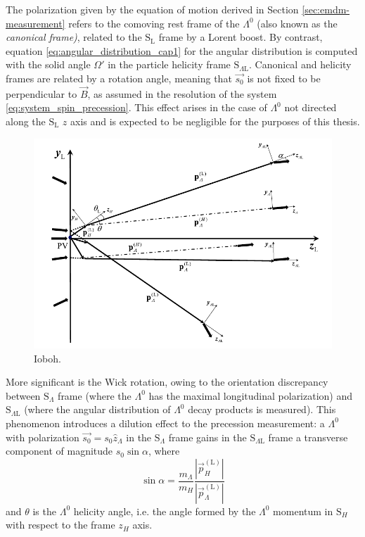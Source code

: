 The polarization given by the equation of motion derived in Section \ref{sec:emdm-measurement} refers to the comoving rest frame of the $\Lambda^0$ (also known as the \textit{canonical frame)}, related to the $\text{S}_\text{L}$ frame by a Lorent boost.
By contrast, equation \eqref{eq:angular_distribution_cap1} for the angular distribution is computed with the solid angle $\Omega'$ in the particle helicity frame $\text{S}_{\Lambda\text{L}}$.
Canonical and helicity frames are related by a rotation angle, meaning that $\vec{s_0}$ is not fixed to be perpendicular to $\vec{B}$, as assumed in the resolution of the system   \eqref{eq:system_spin_precession}.
This effect arises in the case of $\Lambda^0$ not directed along the $\text{S}_\text{L}$ $z$ axis and is expected to be negligible for the purposes of this thesis.

\begin{figure}[t]
	\centering
	\includegraphics[scale=0.7]{graphics/01-standard_model/heavy-baryon-production.pdf}
	\caption[Diagram of $\Lambda^0_b$ and $\Lambda^0$ production at LHCb.]{Ioboh.}
	\label{fig:heavy-baryon-production}
\end{figure}

More significant is the Wick rotation, owing to the orientation discrepancy between $\text{S}_\Lambda$ frame (where the $\Lambda^0$ has the maximal longitudinal polarization)  and $\text{S}_{\Lambda \text{L}}$ (where the angular distribution of $\Lambda^0$ decay products is measured).
This phenomenon introduces a dilution effect to the precession measurement: a $\Lambda^0$ with polarization $\vec{s_0} = s_0 \hat{z}_\Lambda$ in the $\text{S}_\Lambda$ frame gains in the $\text{S}_{\Lambda\text{L}}$ frame a transverse component of magnitude $s_0 \sin\alpha$, where \cite{spinInParticlePhysics}
\begin{equation}
\sin\alpha = \frac{m_\Lambda}{m_H} \frac{\left\lvert \vec{p}_H^{(\text{L})} \right\lvert}{\left\lvert \vec{p}_\Lambda^{(\text{L})} \right\lvert}
\end{equation}
and $\theta$ is the $\Lambda^0$ helicity angle, i.e. the angle formed by the $\Lambda^0$ momentum in $\text{S}_H$ with respect to the frame $z_H$ axis.


